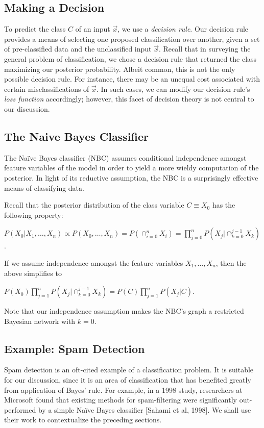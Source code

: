 \documentclass[12pt,twoside]{reedthesis}
\begin{document}
		\subsection*{Making a Decision}
	
	To predict the class $C$ of an input $\vec{x}$, we use a {\em decision rule}.
	Our decision rule provides a means of selecting one proposed classification over another, given a set of pre-classified data and the unclassified input $\vec{x}$.
	Recall that in surveying the general problem of classification, we chose a decision rule that returned the class maximizing our posterior probability. 
	Albeit common, this is not the only possible decision rule. 
	For instance, there may be an unequal cost associated with certain misclassifications of $\vec{x}$. In such cases, we can modify our decision rule's {\em loss function} accordingly; however, this facet of decision theory is not central to our discussion.
	 
	\subsection*{The Naive Bayes Classifier} %
	The Na\"{i}ve Bayes classifier (NBC) assumes conditional independence amongst feature variables of the model in order to yield a more wieldy computation of the posterior. 
	In light of its reductive assumption, the NBC is a surprisingly effective means of classifying data.
	
	Recall that the posterior distribution of the class variable $C \equiv X_0$ has the following property:
	\begin{center}
		$P(X_0 | X_1, \ldots , X_n) \propto
		P(X_0,\ldots,X_n) = 
		P( \displaystyle\cap_{i=0}^{n} X_i) = 
		\displaystyle\prod_{j=0}^{n} P(X_j | \displaystyle\cap_{k=0}^{j-1}X_k)$.
	\end{center}
	If we assume independence amongst the feature variables $X_1,\ldots,X_n$, then the above simplifies to
	\begin{center}
		$P(X_0) \displaystyle\prod_{j=1}^{n} P(X_j | \displaystyle\cap_{k=0}^{j-1}X_k)
		= P(C) \displaystyle\prod_{j=1}^{n} P(X_j | C)$.
	\end{center}
	Note that our independence assumption makes the NBC's graph a restricted Bayesian network with $k = 0$.
	\subsection*{Example: Spam Detection}
	Spam detection is an oft-cited example of a classification problem. It is suitable for our discussion, since it is an area of classification that has benefited greatly from application of Bayes' rule. For example, in a 1998 study, researchers at Microsoft found that existing methods for spam-filtering were significantly out-performed by a simple Na\"{i}ve Bayes classifier [Sahami et al, 1998]. We shall use their work to contextualize the preceding sections.
	
\end{document}
